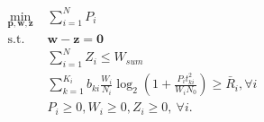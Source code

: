 \documentclass[journal]{IEEEtran}
\begin{document}
\begin{subequations}\label{eq11}
	\begin{align}
	\min_{\mathbf{p}, \mathbf{w}, \mathbf{z}}\ & \sum\limits_{i = 1}^{N} P_i \label{eq11a} \\ \mbox{s.t.} \quad &  \mathbf{w} - \mathbf{z} = \mathbf{0} \label{eq11b} \\ \quad &  \sum\limits_{i = 1}^{N}Z_i \leq W_{sum} \label{eq11c} \\ \quad &  \sum\limits_{k = 1}^{K_i}b_{ki}\frac{W_i}{N_i}\log_2\left(1 + \frac{P_it_{ki}^2}{W_iN_0}\right) \geq \bar{R}_i, \forall i \label{eq11d}\\
	& P_i \geq 0, W_i \geq 0, Z_i \geq 0, \ \forall i. \label{eq11e}
	\end{align}
\end{subequations}
\end{document}
